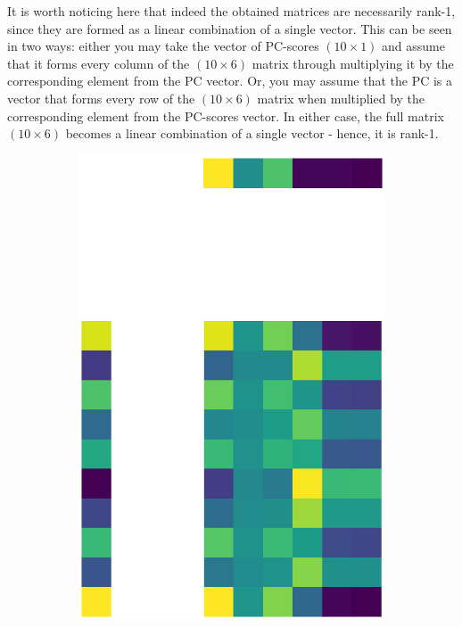 \documentclass[10pt,twocolumn]{article}
\begin{document}
It is worth noticing here that indeed the obtained matrices are necessarily rank-1, since they are formed as a linear combination of a single vector. This can be seen in two ways: either you may take the vector of PC-scores $(10 \times 1)$ and assume that it forms every column of the $(10 \times 6)$ matrix through multiplying it by the corresponding element from the PC vector. Or, you may assume that the PC is a vector that forms every row of the $(10 \times 6)$ matrix when multiplied by the corresponding element from the PC-scores vector. In either case, the full matrix $(10 \times 6)$ becomes a linear combination of a single vector - hence, it is rank-1.

\begin{figure}[H]
\begin{subfigure}[t]{.15\textwidth}
\centering
\includegraphics[scale=.2]{DWGs/random-matrix-reconstruction-PCs-1.eps}

\end{subfigure}
\end{figure}
\end{document}
